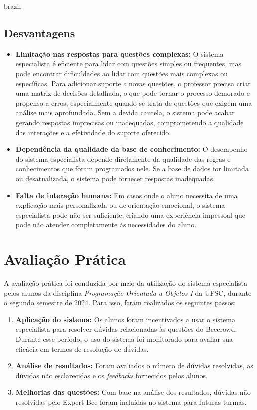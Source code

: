\begin{otherlanguage*}{brazil}
\subsection{Desvantagens}
\begin{itemize}
	\item \textbf{Limitação nas respostas para questões complexas:} O sistema especialista é eficiente para lidar com questões simples ou frequentes, mas pode encontrar dificuldades ao lidar com questões mais complexas ou específicas. Para adicionar suporte a novas questões, o professor precisa criar uma matriz de decisões detalhada, o que pode tornar o processo demorado e propenso a erros, especialmente quando se trata de questões que exigem uma análise mais aprofundada. Sem a devida cautela, o sistema pode acabar gerando respostas imprecisas ou inadequadas, comprometendo a qualidade das interações e a efetividade do suporte oferecido.
    \item \textbf{Dependência da qualidade da base de conhecimento:} O desempenho do sistema especialista depende diretamente da qualidade das regras e conhecimentos que foram programados nele. Se a base de dados for limitada ou desatualizada, o sistema pode fornecer respostas inadequadas.
    \item \textbf{Falta de interação humana:} Em casos onde o aluno necessita de uma explicação mais personalizada ou de orientação emocional, o sistema especialista pode não ser suficiente, criando uma experiência impessoal que pode não atender completamente às necessidades do aluno.
\end{itemize}

\section{Avaliação Prática}

A avaliação prática foi conduzida por meio da utilização do sistema especialista pelos alunos da disciplina \textit{Programação Orientada a Objetos I} da UFSC, durante o segundo semestre de 2024. Para isso, foram realizados os seguintes passos:

\begin{enumerate}
    \item \textbf{Aplicação do sistema:} Os alunos foram incentivados a usar o sistema especialista para resolver dúvidas relacionadas às questões do Beecrowd. Durante esse período, o uso do sistema foi monitorado para avaliar sua eficácia em termos de resolução de dúvidas.
    \item \textbf{Análise de resultados:} Foram avaliados o número de dúvidas resolvidas, as dúvidas não esclarecidas e os \textit{feedbacks} fornecidos pelos alunos.
    \item \textbf{Melhorias das questões:} Com base na análise dos resultados, dúvidas não resolvidas pelo Expert Bee foram incluídas no sistema para futuras turmas.
\end{enumerate}


\end{otherlanguage*}
